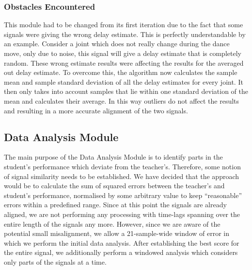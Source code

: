 \documentclass[11pt,a4paper]{article}
\begin{document}
\subsubsection{Obstacles Encountered}
\noindent
This module had to be changed from its first iteration due to the fact that some signals were giving the wrong delay estimate. This is perfectly understandable by an example. Consider a joint which does not really change during the dance move, only due to noise, this signal will give a delay estimate that is completely random. These wrong estimate results were affecting the results for the averaged out delay estimate. To overcome this, the algorithm now calculates the sample mean and sample standard deviation of all the delay estimates for every joint. It then only takes into account samples that lie within one standard deviation of the mean and calculates their average. In this way outliers do not affect the results and resulting in a more accurate alignment of the two signals.  

\subsection{Data Analysis Module}
\noindent
The main purpose of the Data Analysis Module is to identify parts in the student's performance which deviate from the teacher's. Therefore, some notion of signal similarity needs to be established. We have decided that the approach would be to calculate the sum of squared errors  between the teacher's and student's performance, normalised by some arbitrary value to keep ``reasonable'' errors within a predefined range. Since at this point the signals are already aligned, we are not performing any processing with time-lags spanning over the entire length of the signals any more. However, since we are aware of the potential small misalignment, we allow a 21-sample-wide window of error in which we perform the initial data analysis. After establishing the best score for the entire signal, we additionally perform a windowed analysis which considers only parts of the signals at a time.
\end{document}

